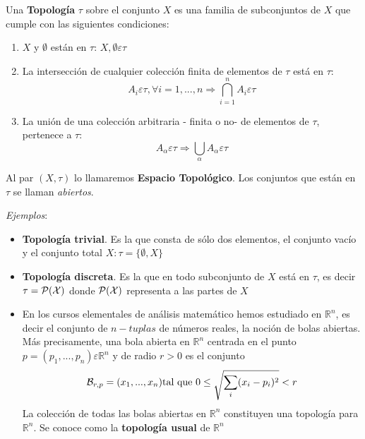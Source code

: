 \begin{definicion}
  Una  {\bf  Topolog\'ia}  $\tau$  sobre  el  conjunto $X$  es  una  familia  de
  subconjuntos de $X$ que cumple con las siguientes condiciones:
  \begin{enumerate}
  \item $X$ y $\emptyset$ est\'an en $\tau$: $X, \emptyset \varepsilon \tau$ %
\item La intersecci\'on de cualquier colecci\'on finita de elementos de $\tau$ est\'a en $\tau$:
\[
A_i \varepsilon \tau, \forall i=1,...,n \Rightarrow \bigcap_{i=1}^n A_i \varepsilon \tau
\]
\item La uni\'on de una colecci\'on arbitraria - finita o no- de elementos de $\tau$, pertenece a $\tau$:
\[
A_{\alpha} \varepsilon \tau \Rightarrow \bigcup_{\alpha} A_{\alpha} \varepsilon \tau
\]
\end{enumerate}
\end{definicion}

\begin{definicion}
Al par $(X,\tau)$ lo llamaremos {\bf Espacio Topol\'ogico}. Los conjuntos que est\'an en $\tau$ se llaman {\it abiertos}.
\end{definicion}

{\it Ejemplos}:

\begin{itemize}
\item {\bf Topolog\'ia trivial}. Es la que consta de s\'olo dos elementos, el conjunto vac\'io y el conjunto total $X: \tau=\{\emptyset,X \}$
    
\item {\bf Topolog\'ia discreta}. Es la que en todo subconjunto de $X$ est\'a en $\tau$, es decir $\tau = \cal{P}(X)$ donde $\cal{P}(X)$ representa a las partes de $X$
    
\item En los cursos elementales de an\'alisis matem\'atico hemos estudiado en $\mathbb{R}^n$, es decir el conjunto de $n-tuplas$ de n\'umeros reales, la noci\'on de bolas abiertas. M\'as precisamente, una bola abierta en $\mathbb{R}^n$ centrada en el punto $p =(p_1,...,p_n) \varepsilon \mathbb{R}^n$ y de radio $r>0$ es el conjunto
    \[
{\cal{B}}_{r,p}={(x_1,...,x_n) \text{tal que   } 0\leq \sqrt{\sum_i (x_i-p_i)^2}<r}
\]
La colecci\'on de todas las bolas abiertas en $\mathbb{R}^n$ constituyen una topolog\'ia para $\mathbb{R}^n$. Se conoce como la {\bf topolog\'ia usual} de $\mathbb{R}^n$

\end{itemize}

